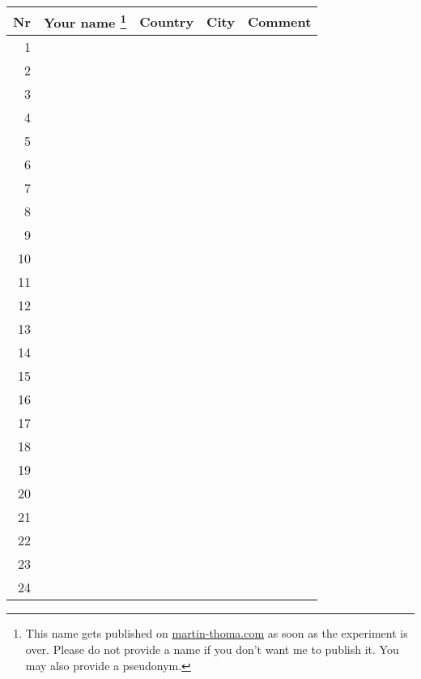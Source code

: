 \documentclass[11pt,a4paper,oneside,landscape]{scrartcl}
\begin{document}
\begin{minipage*}{6cm}
\begin{tabular}{r || p{5cm} | p{4cm} | p{5cm} | p{10cm}}
    Nr & Your name \footnote{This name gets published on \href{http://martin-thoma.com}{martin-thoma.com} as soon as the experiment is over. Please do not provide a name if you don't want me to publish it. You may also provide a pseudonym.}   & Country & City & Comment\\
    \hline
    \hline
1 & & &\\
\hline
2 & & &\\
\hline
3 & & &\\
\hline
4 & & &\\
\hline
5 & & &\\
\hline
6 & & &\\
\hline
7 & & &\\
\hline
8 & & &\\
\hline
9 & & &\\
\hline
10 & & &\\
\hline
11 & & &\\
\hline
12 & & &\\
\hline
13 & & &\\
\hline
14 & & &\\
\hline
15 & & &\\
\hline
16 & & &\\
\hline
17 & & &\\
\hline
18 & & &\\
\hline
19 & & &\\
\hline
20 & & &\\
\hline
21 & & &\\
\hline
22 & & &\\
\hline
23 & & &\\
\hline
24 & & &\\
\hline
\end{tabular}
\end{minipage*}
\end{document}
